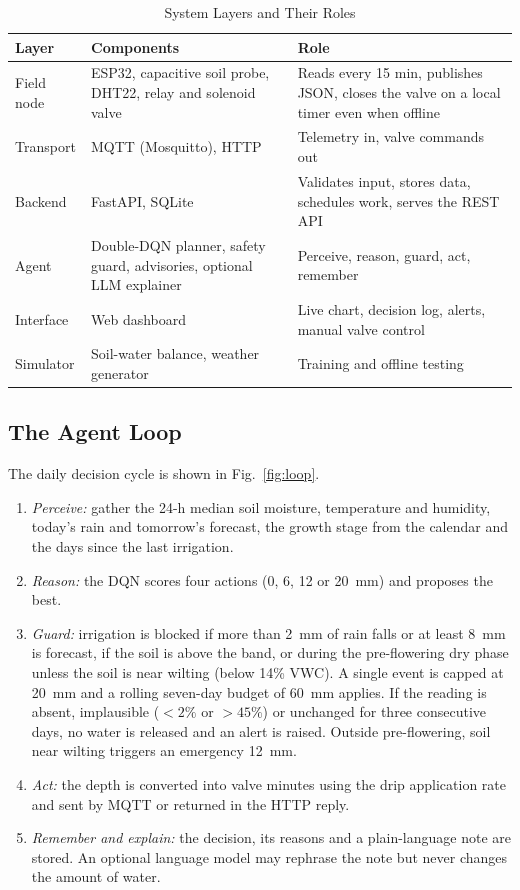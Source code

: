 \documentclass[conference]{IEEEtran}
\begin{document}
\begin{table}[!t]
\caption{System Layers and Their Roles}
\label{tab:arch}
\centering
\footnotesize
\renewcommand{\arraystretch}{1.12}
\begin{tabular}{@{}>{\raggedright\arraybackslash}p{}>{\raggedright\arraybackslash}p{}>{\raggedright\arraybackslash}p{}@{}}
\toprule
\textbf{Layer} & \textbf{Components} & \textbf{Role} \\
\midrule
Field node & ESP32, capacitive soil probe, DHT22, relay and solenoid valve & Reads every 15 min, publishes JSON, closes the valve on a local timer even when offline \\
Transport & MQTT (Mosquitto), HTTP & Telemetry in, valve commands out \\
Backend & FastAPI, SQLite & Validates input, stores data, schedules work, serves the REST API \\
Agent & Double-DQN planner, safety guard, advisories, optional LLM explainer & Perceive, reason, guard, act, remember \\
Interface & Web dashboard & Live chart, decision log, alerts, manual valve control \\
Simulator & Soil-water balance, weather generator & Training and offline testing \\
\bottomrule
\end{tabular}
\end{table}

\subsection{The Agent Loop}
The daily decision cycle is shown in Fig.~\ref{fig:loop}.
\begin{enumerate}
\item \textit{Perceive:} gather the 24-h median soil moisture, temperature and humidity, today's rain and tomorrow's forecast, the growth stage from the calendar and the days since the last irrigation.
\item \textit{Reason:} the DQN scores four actions (0, 6, 12 or 20~mm) and proposes the best.
\item \textit{Guard:} irrigation is blocked if more than 2~mm of rain falls or at least 8~mm is forecast, if the soil is above the band, or during the pre-flowering dry phase unless the soil is near wilting (below 14\% VWC). A single event is capped at 20~mm and a rolling seven-day budget of 60~mm applies. If the reading is absent, implausible ($<2\%$ or $>45\%$) or unchanged for three consecutive days, no water is released and an alert is raised. Outside pre-flowering, soil near wilting triggers an emergency 12~mm.
\item \textit{Act:} the depth is converted into valve minutes using the drip application rate and sent by MQTT or returned in the HTTP reply.
\item \textit{Remember and explain:} the decision, its reasons and a plain-language note are stored. An optional language model may rephrase the note but never changes the amount of water.
\end{enumerate}
\end{document}
